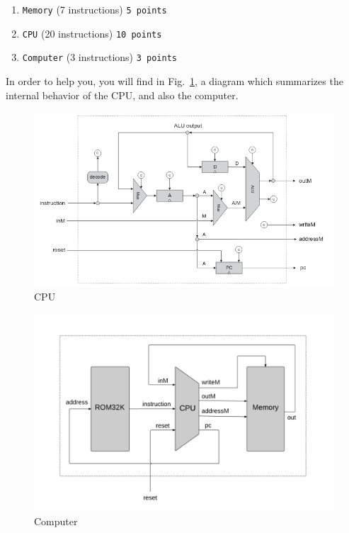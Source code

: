 \documentclass[11pt]{article}
\begin{document}
\begin{enumerate}
\item \texttt{Memory} (7 instructions) \hspace*{\fill} \texttt{\small  5 points}
\item \texttt{CPU} (20 instructions) \hspace*{\fill} \texttt{\small  10 points}
\item \texttt{Computer} (3 instructions)  \hspace*{\fill} \texttt{\small  3 points}
\end{enumerate}

In order to help you, you will find in Fig.~\ref{fig:cpu}, a diagram which summarizes the internal behavior of the CPU, and also the computer.

\begin{figure}[h!]
	\centering
	\includegraphics[scale=0.5]{pictures/cpu.png}
	\caption{CPU}
	\label{fig:cpu}
\end{figure}

\begin{figure}[h!]
	\centering
	\includegraphics[scale=0.5]{pictures/cmp.png}
	\caption{Computer}
	\label{fig:comp}
\end{figure}
\end{document}
